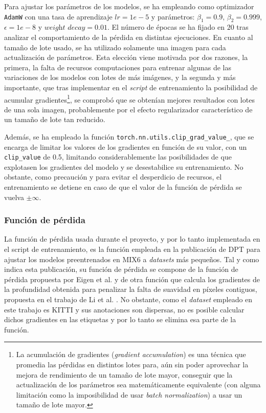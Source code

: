 Para ajustar los parámetros de los modelos, se ha empleando como optimizador \texttt{AdamW} con una tasa de aprendizaje $lr = 1e-5$ y parámetros: $\beta_1 = 0.9$, $\beta_2 = 0.999$, $\epsilon = 1e-8$ y $\textit{weight decay} = 0.01$. El número de épocas se ha fijado en $20$ tras analizar el comportamiento de la pérdida en distintas ejecuciones. En cuanto al tamaño de lote usado, se ha utilizado solamente una imagen para cada actualización de parámetros. Esta elección viene motivada por dos razones, la primera, la falta de recursos computaciones para entrenar algunas de las variaciones de los modelos con lotes de más imágenes, y la segunda y más importante, que tras implementar en el \textit{script} de entrenamiento la posibilidad de acumular gradientes\footnote{La acumulación de gradientes (\textit{gradient accumulation}) es una técnica que promedia las pérdidas en distintos lotes para, aún sin poder aprovechar la mejora de rendimiento de un tamaño de lote mayor, conseguir que la actualización de los parámetros sea matemáticamente equivalente (con alguna limitación como la imposibilidad de usar \textit{batch normalization}) a usar un tamaño de lote mayor.}, se comprobó que se obtenían mejores resultados con lotes de una sola imagen, probablemente por el efecto regularizador característico de un tamaño de lote tan reducido.

Además, se ha empleado la función \texttt{torch.nn.utils.clip\_grad\_value\_}, que se encarga de limitar los valores de los gradientes en función de su valor, con un \texttt{clip\_value} de 0.5, limitando considerablemente las posibilidades de que explotasen los gradientes del modelo y se desestabilice su entrenamiento. No obstante, como precaución y para evitar el desperdicio de recursos, el entrenamiento se detiene en caso de que el valor de la función de pérdida se vuelva $\pm \infty$.


\subsubsection{Función de pérdida}
La función de pérdida usada durante el proyecto, y por lo tanto implementada en el script de entrenamiento, es la función empleada en la publicación de DPT \cite{visiontransformersDPT} para ajustar los modelos preentrenados en MIX6 a \textit{datasets} más pequeños. Tal y como indica esta publicación, su función de pérdida se compone de la función de pérdida propuesta por Eigen et al. \cite{eigen-multi-scale} y de otra función que calcula los gradientes de la profundidad obtenida para penalizar la falta de suavidad en píxeles contiguos, propuesta en el trabajo de Li et al. \cite{MegaDepthLi18}. No obstante, como el \textit{dataset} empleado en este trabajo es KITTI y sus anotaciones son dispersas, no es posible calcular dichos gradientes en las etiquetas y por lo tanto se elimina esa parte de la función. 

